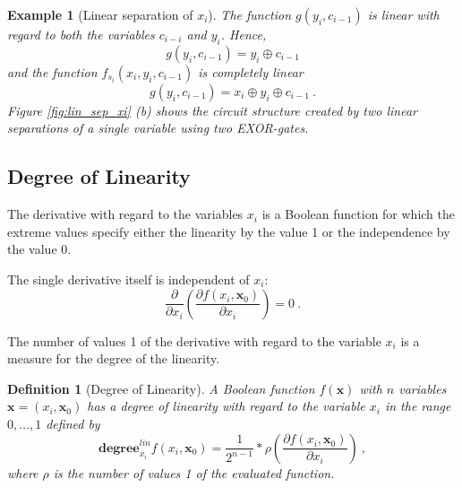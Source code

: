 \documentclass[a4paper]{article}
\newtheorem{definition}{Definition}
\newtheorem{example}{Example}
\newcommand\bx{\mathbf{x}}
\begin{document}
\begin{example}[Linear separation of $x_i$]
The function $g(y_i,c_{i-1})$ is linear with regard to both the variables $c_{i-i}$ and $y_i$. Hence, 
	\[
	g(y_i,c_{i-1}) = y_i \oplus c_{i-1}
\]
and the function $f_{s_i}(x_i,y_i,c_{i-1})$ is completely linear 
	\[
	g(y_i,c_{i-1}) = x_i \oplus y_i \oplus c_{i-1}~.
\]
Figure \ref{fig:lin_sep_xi} (b) shows the circuit structure created by two linear separations of a single variable using two EXOR-gates.
\end{example}




\subsection{Degree of Linearity}

The derivative with regard to the variables $x_i$ is a Boolean function for which the extreme values specify either the linearity
by the value 1 or the independence 
by the value 0. 

The single derivative itself is independent of $x_i$:
\begin{equation}
\frac{\partial }{\partial x_i} \left(\frac{\partial f(x_i,\bx_0)}{\partial x_i} \right)= 0~.
\label{equ:sder_indep_xi}
\end{equation}

The number of values 1 of the derivative with regard to the variable $x_i$ is a measure for the degree of the linearity. 

\begin{definition}[Degree of Linearity]
A Boolean function $f(\bx)$ with $n$ variables $\bx = (x_i,\bx_0)$ has a \emph{degree of linearity} with regard to the variable $x_i$ in the range $0,\dots,1$ defined by
\begin{equation}
\mathbf{degree}^{lin}_{x_i}f(x_i,\bx_0) = \frac{1}{2^{n-1}} * \rho\left(\frac{\partial f(x_i,\bx_0)}{\partial x_i} \right)~,
\label{equ:deg_lin_xi}
\end{equation}
where $\rho$ is the number of values 1 of the evaluated function.
\end{definition}
\end{document}
